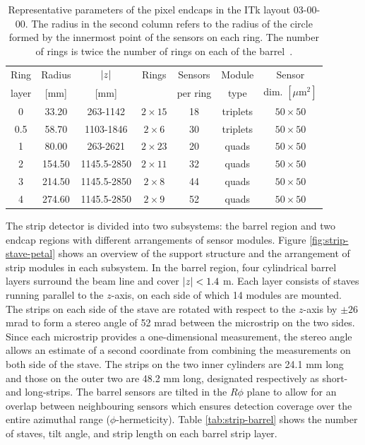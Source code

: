 \begin{table}[h]
    \centering
    
    \begin{tabular}{|c|c|c|c|c|c|c|}
    \hline
        Ring & Radius  & $\abs{z}$ & Rings        & Sensors  & Module   & Sensor  \\
        layer& [mm]    & [mm]      &              & per ring & type     & dim. $[\mu\mathrm{m}^2]$ \\ \hline
        0    & 33.20   & 263-1142  & $2\times 15$ & 18       & triplets & $50\times50$\\
        0.5  & 58.70   & 1103-1846  & $2\times 6$ & 30       & triplets & $50\times50$\\
        1    & 80.00   & 263-2621  & $2\times 23$ & 20       & quads    & $50\times50$\\
        2    & 154.50  & 1145.5-2850  & $2\times 11$ & 32       & quads    & $50\times50$\\
        3    & 214.50  & 1145.5-2850  & $2\times 8$ & 44       & quads    & $50\times50$\\
        4    & 274.60  & 1145.5-2850  & $2\times 9$ & 52       & quads    & $50\times50$\\
        \hline
    \end{tabular}
    \caption{Representative parameters of the pixel endcaps in the ITk layout 03-00-00. The radius in the second column refers to the radius of the circle formed by the innermost point of the sensors on each ring. The number of rings is twice the number of rings on each of the barrel~\cite{Aad_2025}.}
    \label{tab:pixel-endcap-rings}
\end{table}

The strip detector is divided into two subsystems: the barrel region and two endcap regions with different arrangements of sensor modules. 
Figure \ref{fig:strip-stave-petal} shows an overview of the support structure and the arrangement of strip modules in each subsystem. 
In the barrel region, four cylindrical barrel layers surround the beam line and cover $\abs{z} < 1.4$ m. 
Each layer consists of staves running parallel to the $z$-axis, on each side of which 14 modules are mounted. 
The strips on each side of the stave are rotated with respect to the $z$-axis by $\pm26$ mrad to form a stereo angle of 52 mrad between the microstrip on the two sides. 
Since each microstrip provides a one-dimensional measurement, the stereo angle allows an estimate of a second coordinate from combining the measurements on both side of the stave. 
The strips on the two inner cylinders are 24.1 mm long and those on the outer two are 48.2 mm long, designated respectively as short- and long-strips. 
The barrel sensors are tilted in the $R\phi$ plane to allow for an overlap between neighbouring sensors which ensures detection coverage over the entire azimuthal range ($\phi$-hermeticity). 
Table \ref{tab:strip-barrel} shows the number of staves, tilt angle, and strip length on each barrel strip layer. 

